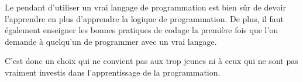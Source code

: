 Le pendant d'utiliser un vrai langage de programmation est bien sûr de devoir l'apprendre en plus d'apprendre la logique de programmation. De plus, il faut également enseigner les bonnes pratiques de codage la première fois que l'on demande à quelqu'un de programmer avec un vrai langage. 

C'est donc un choix qui ne convient pas aux trop jeunes ni à ceux qui ne sont pas vraiment investis dans l'apprentissage de la programmation.
